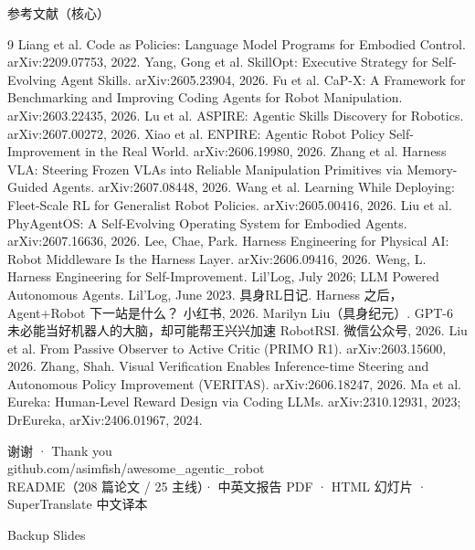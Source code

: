 \documentclass[aspectratio=169,10pt]{beamer}
\newcommand{\en}[1]{{\footnotesize\textcolor{neutral}{#1}}}
\begin{document}
\begin{frame}[allowframebreaks]{参考文献（核心）}
\small
\begin{thebibliography}{9}
 Liang et al. Code as Policies: Language Model Programs for Embodied Control. arXiv:2209.07753, 2022.
 Yang, Gong et al. SkillOpt: Executive Strategy for Self-Evolving Agent Skills. arXiv:2605.23904, 2026.
 Fu et al. CaP-X: A Framework for Benchmarking and Improving Coding Agents for Robot Manipulation. arXiv:2603.22435, 2026.
 Lu et al. ASPIRE: Agentic Skills Discovery for Robotics. arXiv:2607.00272, 2026.
 Xiao et al. ENPIRE: Agentic Robot Policy Self-Improvement in the Real World. arXiv:2606.19980, 2026.
 Zhang et al. Harness VLA: Steering Frozen VLAs into Reliable Manipulation Primitives via Memory-Guided Agents. arXiv:2607.08448, 2026.
 Wang et al. Learning While Deploying: Fleet-Scale RL for Generalist Robot Policies. arXiv:2605.00416, 2026.
 Liu et al. PhyAgentOS: A Self-Evolving Operating System for Embodied Agents. arXiv:2607.16636, 2026.
 Lee, Chae, Park. Harness Engineering for Physical AI: Robot Middleware Is the Harness Layer. arXiv:2606.09416, 2026.
 Weng, L. Harness Engineering for Self-Improvement. Lil'Log, July 2026; LLM Powered Autonomous Agents. Lil'Log, June 2023.
 具身RL日记. Harness 之后，Agent+Robot 下一站是什么？ 小红书, 2026.
 Marilyn Liu（具身纪元）. GPT-6 未必能当好机器人的大脑，却可能帮王兴兴加速 RobotRSI. 微信公众号, 2026.
 Liu et al. From Passive Observer to Active Critic (PRIMO R1). arXiv:2603.15600, 2026.
 Zhang, Shah. Visual Verification Enables Inference-time Steering and Autonomous Policy Improvement (VERITAS). arXiv:2606.18247, 2026.
 Ma et al. Eureka: Human-Level Reward Design via Coding LLMs. arXiv:2310.12931, 2023; DrEureka, arXiv:2406.01967, 2024.
\end{thebibliography}
\end{frame}

\begin{frame}
\centering
{\Large 谢谢 · Thank you}\\[8pt]
github.com/asimfish/awesome\_agentic\_robot\\[4pt]
\en{README（208 篇论文 / 25 主线）· 中英文报告 PDF · HTML 幻灯片 · SuperTranslate 中文译本}
\end{frame}

\appendix
\begin{frame}{Backup Slides}
\end{frame}
\end{document}
